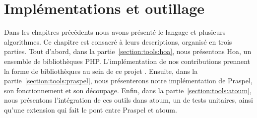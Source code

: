 \chapter{Implémentations et outillage}
\label{chapter:tools}

\minitoc

Dans les chapitres précédents nous avons présenté le langage et plusieurs
algorithmes. Ce chapitre est consacré à leurs descriptions, organisé en trois
parties. Tout d'abord, dans la partie~\ref{section:tools:hoa}, nous présentons
Hoa, un ensemble de bibliothèques PHP. L'implémentation de nos contributions
prennent la forme de bibliothèques au sein de ce projet .
Ensuite, dans la partie~\ref{section:tools:praspel}, nous présenterons notre
implémentation de Praspel, son fonctionnement et son découpage. Enfin, dans la
partie~\ref{section:tools:atoum}, nous présentons l'intégration de ces outils
dans atoum, un  de tests unitaires, ainsi qu'une extension
qui fait le pont entre Praspel et atoum.

